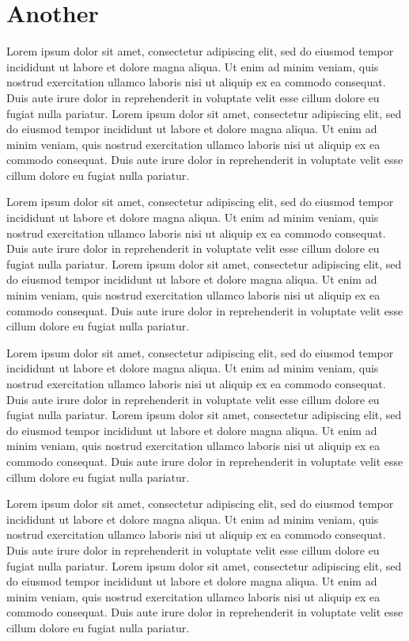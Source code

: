 \documentclass{book}
\begin{document}
\section{Another}
Lorem ipsum dolor sit amet, consectetur adipiscing elit, sed do eiusmod tempor incididunt ut labore et dolore magna aliqua. Ut enim ad minim veniam, quis nostrud exercitation ullamco laboris nisi ut aliquip ex ea commodo consequat. Duis aute irure dolor in reprehenderit in voluptate velit esse cillum dolore eu fugiat nulla pariatur. Lorem ipsum dolor sit amet, consectetur adipiscing elit, sed do eiusmod tempor incididunt ut labore et dolore magna aliqua. Ut enim ad minim veniam, quis nostrud exercitation ullamco laboris nisi ut aliquip ex ea commodo consequat. Duis aute irure dolor in reprehenderit in voluptate velit esse cillum dolore eu fugiat nulla pariatur.

Lorem ipsum dolor sit amet, consectetur adipiscing elit, sed do eiusmod tempor incididunt ut labore et dolore magna aliqua. Ut enim ad minim veniam, quis nostrud exercitation ullamco laboris nisi ut aliquip ex ea commodo consequat. Duis aute irure dolor in reprehenderit in voluptate velit esse cillum dolore eu fugiat nulla pariatur. Lorem ipsum dolor sit amet, consectetur adipiscing elit, sed do eiusmod tempor incididunt ut labore et dolore magna aliqua. Ut enim ad minim veniam, quis nostrud exercitation ullamco laboris nisi ut aliquip ex ea commodo consequat. Duis aute irure dolor in reprehenderit in voluptate velit esse cillum dolore eu fugiat nulla pariatur.

Lorem ipsum dolor sit amet, consectetur adipiscing elit, sed do eiusmod tempor incididunt ut labore et dolore magna aliqua. Ut enim ad minim veniam, quis nostrud exercitation ullamco laboris nisi ut aliquip ex ea commodo consequat. Duis aute irure dolor in reprehenderit in voluptate velit esse cillum dolore eu fugiat nulla pariatur. Lorem ipsum dolor sit amet, consectetur adipiscing elit, sed do eiusmod tempor incididunt ut labore et dolore magna aliqua. Ut enim ad minim veniam, quis nostrud exercitation ullamco laboris nisi ut aliquip ex ea commodo consequat. Duis aute irure dolor in reprehenderit in voluptate velit esse cillum dolore eu fugiat nulla pariatur.

Lorem ipsum dolor sit amet, consectetur adipiscing elit, sed do eiusmod tempor incididunt ut labore et dolore magna aliqua. Ut enim ad minim veniam, quis nostrud exercitation ullamco laboris nisi ut aliquip ex ea commodo consequat. Duis aute irure dolor in reprehenderit in voluptate velit esse cillum dolore eu fugiat nulla pariatur. Lorem ipsum dolor sit amet, consectetur adipiscing elit, sed do eiusmod tempor incididunt ut labore et dolore magna aliqua. Ut enim ad minim veniam, quis nostrud exercitation ullamco laboris nisi ut aliquip ex ea commodo consequat. Duis aute irure dolor in reprehenderit in voluptate velit esse cillum dolore eu fugiat nulla pariatur.
\end{document}
